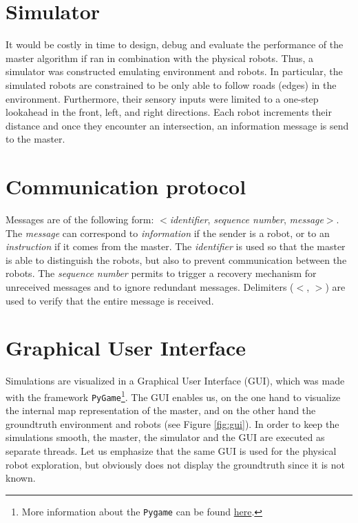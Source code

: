 \documentclass[12pt]{report}
\begin{document}
\section{Simulator}
It would be costly in time to design, debug and evaluate the performance of the master algorithm if ran in combination with the physical robots. Thus, a simulator was constructed emulating environment and robots. In particular, the simulated robots are constrained to be only able to follow roads (edges) in the environment. Furthermore, their sensory inputs were limited to a one-step lookahead in the front, left, and right directions. Each robot increments their distance and once they encounter an intersection, an information message is send to the master.

\section{Communication protocol}
Messages are of the following form: $<$\textit{identifier}, \textit{sequence number}, \textit{message}$>$. The \textit{message} can correspond to \textit{information} if the sender is a robot, or to an \textit{instruction} if it comes from the master. The \textit{identifier} is used so that the master is able to distinguish the robots, but also to prevent communication between the robots. The \textit{sequence number} permits to trigger a recovery mechanism for unreceived messages and to ignore redundant messages. Delimiters ($<$, $>$) are used to verify that the entire message is received.

\section{Graphical User Interface}
Simulations are visualized in a Graphical User Interface (GUI), which was made with the framework \texttt{PyGame}\footnote{More information about the \texttt{Pygame} can be found \href{www.pygame.org}{here}.}. The GUI enables us, on the one hand to visualize the internal map representation of the master, and on the other hand the groundtruth environment and robots (see Figure \ref{fig:gui}). In order to keep the simulations smooth, the master, the simulator and the GUI are executed as separate threads. Let us emphasize that the same GUI is used for the physical robot exploration, but obviously does not display the groundtruth since it is not known. 
\end{document}
